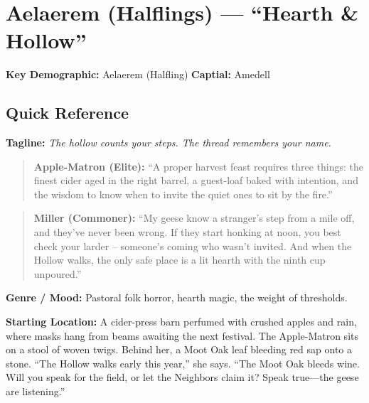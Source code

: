 \section{Aelaerem (Halflings) --- ``Hearth \& Hollow''}
\label{chap:aelaerem}

\textbf{Key Demographic: } Aelaerem (Halfling)
\textbf{Captial: } Amedell

\subsection*{Quick Reference}
\textbf{Tagline:} \textit{The hollow counts your steps. The thread remembers your name.}

\begin{quote}
  \textbf{Apple-Matron (Elite):}  
  ``A proper harvest feast requires three things: the finest cider aged in the right barrel, a guest-loaf baked with intention, and the wisdom to know when to invite the quiet ones to sit by the fire.''
\end{quote}

\begin{quote}
  \textbf{Miller (Commoner):}  
  ``My geese know a stranger's step from a mile off, and they've never been wrong. If they start honking at noon, you best check your larder -- someone's coming who wasn't invited. And when the Hollow walks, the only safe place is a lit hearth with the ninth cup unpoured.''
\end{quote}

\textbf{Genre / Mood:} Pastoral folk horror, hearth magic, the weight of thresholds.

\textbf{Starting Location:} A cider-press barn perfumed with crushed apples and rain, where masks hang from beams awaiting the next festival. The Apple-Matron sits on a stool of woven twigs. Behind her, a Moot Oak leaf bleeding red sap onto a stone. ``The Hollow walks early this year,'' she says. ``The Moot Oak bleeds wine. Will you speak for the field, or let the Neighbors claim it? Speak true---the geese are listening.''

